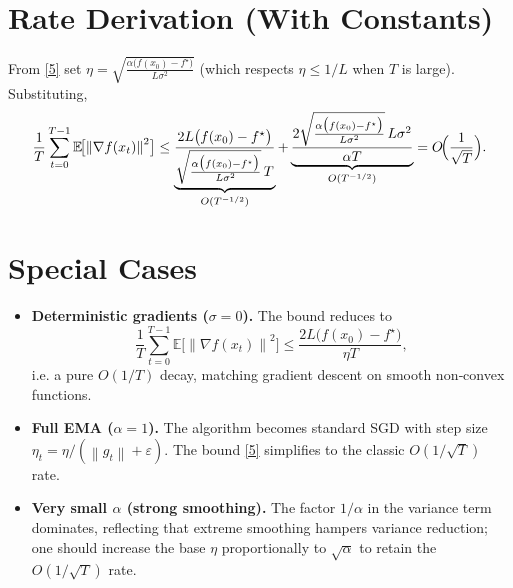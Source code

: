 \documentclass{article}
\newcommand{\E}{\mathbb{E}}
\newcommand{\norm}[1]{\left\|#1\right\|}
\begin{document}
\section*{Rate Derivation (With Constants)}
From \eqref{5} set $\eta = \sqrt{\frac{\alpha\bigl(f(x_0)-f^\star\bigr)}{L\sigma^2}}$ (which respects $\eta\le1/L$ when $T$ is large). Substituting,
\[
\frac{1}{T}\sum_{t=0}^{T-1}\E\!\bigl[\norm{\nabla f(x_t)}^2\bigr]
\le
\underbrace{\frac{2L\bigl(f(x_0)-f^\star\bigr)}{\sqrt{\frac{\alpha\bigl(f(x_0)-f^\star\bigr)}{L\sigma^2}}\,T}}_{O(T^{-1/2})}
+\underbrace{\frac{2\sqrt{\frac{\alpha\bigl(f(x_0)-f^\star\bigr)}{L\sigma^2}}\,L\sigma^2}{\alpha T}}_{O(T^{-1/2})}
=O\!\Bigl(\frac{1}{\sqrt{T}}\Bigr).
\]

\section*{Special Cases}
\begin{itemize}
\item \textbf{Deterministic gradients ($\sigma=0$).} The bound reduces to 
\[
\frac{1}{T}\sum_{t=0}^{T-1}\E\!\bigl[\norm{\nabla f(x_t)}^2\bigr]
\le\frac{2L\bigl(f(x_0)-f^\star\bigr)}{\eta T},
\]
i.e. a pure $O(1/T)$ decay, matching gradient descent on smooth non‑convex functions.
\item \textbf{Full EMA ($\alpha=1$).} The algorithm becomes standard SGD with step size $\eta_t=\eta/(\norm{g_t}+\varepsilon)$. The bound \eqref{5} simplifies to the classic $O(1/\sqrt{T})$ rate.
\item \textbf{Very small $\alpha$ (strong smoothing).} The factor $1/\alpha$ in the variance term dominates, reflecting that extreme smoothing hampers variance reduction; one should increase the base $\eta$ proportionally to $\sqrt{\alpha}$ to retain the $O(1/\sqrt{T})$ rate.
\end{itemize}
\end{document}
